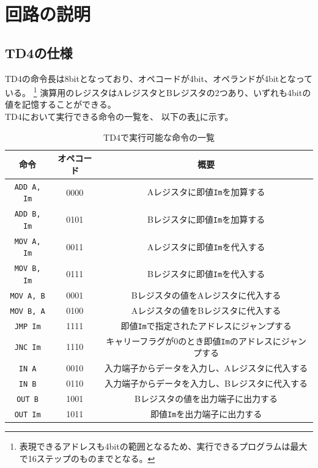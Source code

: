 \documentclass[dvipdfmx,a4j, titlepage]{jsarticle}
\begin{document}
\section{回路の説明}
\subsection{TD4の仕様}
TD4の命令長は8bitとなっており、オペコードが4bit、オペランドが4bitとなっている。
\footnote { 表現できるアドレスも4bitの範囲となるため、実行できるプログラムは最大で16ステップのものまでとなる。 }
演算用のレジスタはAレジスタとBレジスタの2つあり、いずれも4bitの値を記憶することができる。\\
TD4において実行できる命令の一覧を、 以下の表\ref{instruction_list}に示す。

\begin{table}[hbtp]
    \caption{TD4で実行可能な命令の一覧}
    \label{instruction_list}
    \centering
    \begin{tabular}{ccc}
        \hline
        命令                                  & オペコード & 概要                                                                       \\
        \hline \hline
        \verb|ADD A, Im|                & 0000       & Aレジスタに即値\verb|Im|を加算する                            \\
        \verb|ADD B, Im|                & 0101       & Bレジスタに即値\verb|Im|を加算する                            \\
        \verb|MOV A, Im|                & 0011       & Aレジスタに即値\verb|Im|を代入する                            \\
        \verb|MOV B, Im|                & 0111       & Bレジスタに即値\verb|Im|を代入する                            \\
        \verb|MOV A, B|                & 0001       & Bレジスタの値をAレジスタに代入する                                         \\
        \verb|MOV B, A|               & 0100       & Aレジスタの値をBレジスタに代入する                                         \\
        \verb|JMP Im|               & 1111       & 即値\verb|Im|で指定されたアドレスにジャンプする              \\
        \verb|JNC Im|               & 1110       & キャリーフラグが0のとき即値\verb|Im|のアドレスにジャンプする \\
        \verb|IN A|               & 0010       & 入力端子からデータを入力し、Aレジスタに代入する                            \\
        \verb|IN B|               & 0110       & 入力端子からデータを入力し、Bレジスタに代入する                            \\
        \verb|OUT B| \footnotemark & 1001       & Bレジスタの値を出力端子に出力する                                          \\
        \verb|OUT Im|               & 1011       & 即値\verb|Im|を出力端子に出力する                            \\
        \hline
    \end{tabular}
\end{table}
\end{document}
